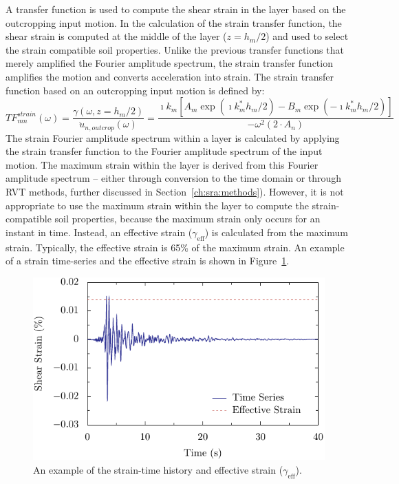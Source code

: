 \documentclass[12pt,oneside]{book}
\begin{document}
A transfer function is used to compute the shear strain in the layer based on the outcropping input
motion.  In the calculation of the strain transfer function, the shear strain is computed at the middle of
the layer ($z=h_m/2$) and used to select the strain compatible soil properties.  Unlike the previous
transfer functions that merely amplified the Fourier amplitude spectrum, the strain transfer
function amplifies the motion and converts acceleration into strain.
The strain transfer function based on an outcropping input motion is defined by:
\begin{equation}
    TF_{mn}^{strain}(\omega) = \frac{\gamma(\omega, z=h_m/2)}{\ddot{u}_{n,outcrop}(\omega)} =
    \frac{\imath k_m \left[
        A_m \exp\left( \imath k_m^* h_m / 2 \right) - B_m \exp\left( -\imath k_m^* h_m / 2 \right) \right]
    }{-\omega^2 \left( 2 \cdot A_n \right)}
    \label{eq:strain_tf}
\end{equation}
The strain Fourier amplitude spectrum within a layer is calculated by applying the strain transfer
function to the Fourier amplitude spectrum of the input motion.  The maximum strain within the layer
is derived from this Fourier amplitude spectrum -- either through conversion to the time domain or
through RVT methods, further discussed in Section~\ref{ch:sra:methods}).  However, it is
not appropriate to use the maximum strain within the layer to compute the strain-compatible soil
properties, because the maximum strain only occurs for an instant in time.  Instead, an effective
strain ($\gamma_{\mathrm{eff}}$) is calculated from the maximum strain.  Typically, the effective
strain is 65\% of the maximum strain. An example of a strain time-series and the effective strain is
shown in Figure~\ref{fig:siteResponse:strainTH}.

\begin{figure}[tb]
    \begin{center}
        \includegraphics[width=\linewidth]{figures/siteResponse/sra-strain-ts.pdf}
    \end{center}
    \caption{An example of the strain-time history and effective strain ($\gamma_{\mathrm{eff}}$).}
    \label{fig:siteResponse:strainTH}
\end{figure}
\end{document}

